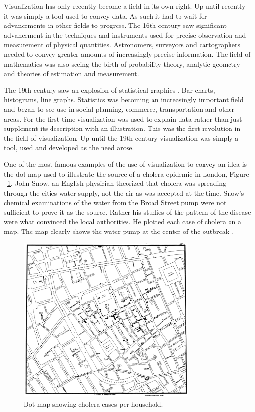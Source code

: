 \documentclass[a4paper, 10pt, titlepage, twocolumn, onehalfspace]{article}
\begin{document}
Visualization has only recently become a field in its own right. Up until recently it was simply a tool used to convey data. As such it had to wait for advancements in other fields to progress. The 16th century saw significant advancement in the techniques and instruments used for precise observation and measurement of physical quantities. Astronomers, surveyors and cartographers needed to convey greater amounts of increasingly precise information. The field of mathematics was also seeing the birth of probability theory, analytic geometry and theories of estimation and measurement.

The 19th century saw an explosion of statistical graphics \cite{friendly2001milestones}. Bar charts, histograms, line graphs. Statistics was becoming an increasingly important field and began to see use in social planning, commerce, transportation and other areas. For the first time visualization was used to explain data rather than just supplement its description with an illustration. This was the first revolution in the field of visualization. Up until the 19th century visualization was simply a tool, used and developed as the need arose.

One of the most famous examples of the use of visualization to convey an idea is the dot map used to illustrate the source of a cholera epidemic in London, Figure ~\ref{fig:dot_map}. John Snow, an English physician theorized that cholera was spreading through the cities water supply, not the air as was accepted at the time. Snow's chemical examinations of the water from the Broad Street pump were not sufficient to prove it as the source. Rather his studies of the pattern of the disease were what convinced the local authorities. He plotted each case of cholera on a map. The map clearly shows the water pump at the center of the outbreak \cite{frerichs2007ghost}.


\begin{figure}[hbt]
  \begin{center}
    \includegraphics[width=3.5in]{snow.jpg}
  \end{center}
  \caption{\small Dot map showing cholera cases per household. }
  \label{fig:dot_map}
\end{figure}
\end{document}
